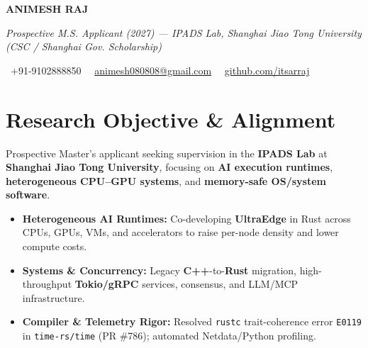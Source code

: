 \documentclass[a4paper,11pt]{article}
\newcommand{\socialicon}[1]{\raisebox{-0.05em}{\resizebox{!}{1em}{#1}}}
\newcommand{\headerfontiii}{\fontfamily{ppl}\selectfont} %
\begin{document}
\headerfontiii

\begin{center}
    {\Huge\textbf{ANIMESH RAJ}}
\end{center}
\vspace{-6mm}

\begin{center}
    {\small\textit{Prospective M.S. Applicant (2027) --- IPADS Lab, Shanghai Jiao Tong University (CSC / Shanghai Gov. Scholarship)}}
\end{center}
\vspace{-6mm}

\begin{center}
    {\small
    \socialicon{\faPhone}\ +91-9102888850 \textbar\ 
    \socialicon{\faEnvelope}\ \href{mailto:animesh080808@gmail.com}{animesh080808@gmail.com} \textbar\ 
    \socialicon{\faGithub}\ \href{https://github.com/itsarraj}{github.com/itsarraj}
    }
\end{center}
\vspace{-4mm}

\section{\textbf{Research Objective \& Alignment}}
\vspace{1mm}
{\small
Prospective Master's applicant seeking supervision in the \textbf{IPADS Lab} at \textbf{Shanghai Jiao Tong University}, focusing on \textbf{AI execution runtimes}, \textbf{heterogeneous CPU–GPU systems}, and \textbf{memory-safe OS/system software}.
\begin{itemize}[leftmargin=3ex, itemsep=0.4mm, topsep=1mm]
    \item \textbf{Heterogeneous AI Runtimes:} Co-developing \textbf{UltraEdge} in Rust across CPUs, GPUs, VMs, and accelerators to raise per-node density and lower compute costs.
    \item \textbf{Systems \& Concurrency:} Legacy \textbf{C++}-to-\textbf{Rust} migration, high-throughput \textbf{Tokio/gRPC} services, consensus, and LLM/MCP infrastructure.
    \item \textbf{Compiler \& Telemetry Rigor:} Resolved \texttt{rustc} trait-coherence error \texttt{E0119} in \texttt{time-rs/time} (PR \#786); automated Netdata/Python profiling.
\end{itemize}
}
\vspace{-3mm}
\end{document}
